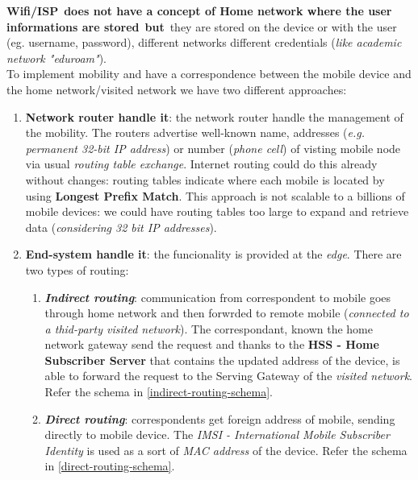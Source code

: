 \documentclass[10pt,a4paper]{report}
\theoremstyle{definition}
\begin{document}
\textbf{Wifi/ISP} \textbf{does not have a concept of Home network where the user informations are stored} \textbf{but} they are stored on the device or with the user (eg. username, password), different networks different credentials (\textit{like academic network "eduroam"}).\\
To implement mobility and have a correspondence between the mobile device and the home network/visited network we have two different approaches:
\begin{enumerate}
	\item 
	\textbf{Network router handle it}: the network router handle the management of the mobility. The routers advertise well-known name, addresses (\textit{e.g. permanent 32-bit IP address}) or number (\textit{phone cell}) of visting mobile node via usual \textit{routing table exchange}.
	Internet routing could do this already without changes: routing tables indicate where each mobile is located by using \textbf{Longest Prefix Match}.
	This approach is not scalable to a billions of mobile devices: we could have routing tables too large to expand and retrieve data (\textit{considering 32 bit IP addresses}).
	\item 
	\textbf{End-system handle it}: the funcionality is provided at the \textit{edge}. There are two types of routing:
	\begin{enumerate}
		\item 
		\textit{\textbf{Indirect routing}}: communication from correspondent to mobile goes through home network and then forwrded to remote mobile (\textit{connected to a thid-party visited network}). The correspondant, known the home network gateway send the request and thanks to the \textbf{HSS - Home Subscriber Server} that contains the updated address of the device, is able to forward the request to the Serving Gateway of the \textit{visited network}. Refer the schema in \ref{indirect-routing-schema}.

		\item 
		\textit{\textbf{Direct routing}}: correspondents get foreign address of mobile, sending directly to mobile device. The \textit{IMSI - International Mobile Subscriber Identity} is used as a sort of \textit{MAC address} of the device. Refer the schema in \ref{direct-routing-schema}.

	\end{enumerate}
\end{enumerate}
\end{document}

